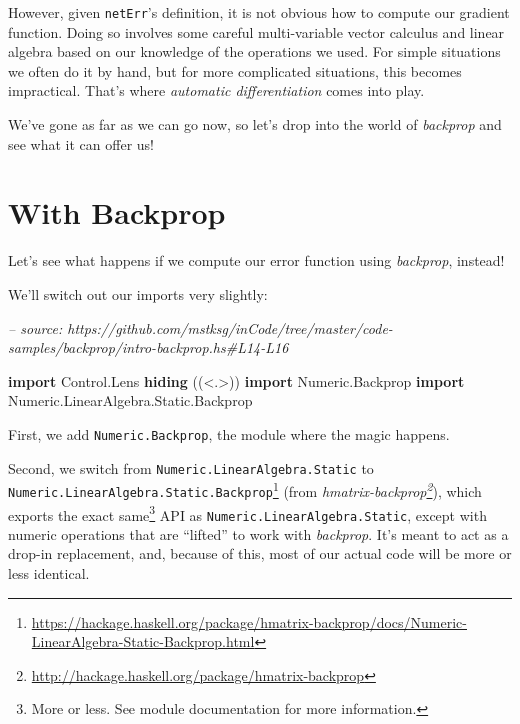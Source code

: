 \documentclass[]{article}
\newenvironment{Shaded}{}{}
\newcommand{\CommentTok}[1]{\textcolor[rgb]{0.38,0.63,0.69}{\textit{#1}}}
\newcommand{\DataTypeTok}[1]{\textcolor[rgb]{0.56,0.13,0.00}{#1}}
\newcommand{\KeywordTok}[1]{\textcolor[rgb]{0.00,0.44,0.13}{\textbf{#1}}}
\newcommand{\NormalTok}[1]{#1}
\renewcommand{\href}[2]{#2\footnote{\url{#1}}}
\begin{document}
However, given \texttt{netErr}'s definition, it is not obvious how to compute
our gradient function. Doing so involves some careful multi-variable vector
calculus and linear algebra based on our knowledge of the operations we used.
For simple situations we often do it by hand, but for more complicated
situations, this becomes impractical. That's where \emph{automatic
differentiation} comes into play.

We've gone as far as we can go now, so let's drop into the world of
\emph{backprop} and see what it can offer us!

\hypertarget{with-backprop}{%
\section{With Backprop}\label{with-backprop}}

Let's see what happens if we compute our error function using \emph{backprop},
instead!

We'll switch out our imports very slightly:

\begin{Shaded}
\begin{Highlighting}[]
\CommentTok{-- source: https://github.com/mstksg/inCode/tree/master/code-samples/backprop/intro-backprop.hs#L14-L16}

\KeywordTok{import}           \DataTypeTok{Control.Lens} \KeywordTok{hiding}\NormalTok{                   ((<.>))}
\KeywordTok{import}           \DataTypeTok{Numeric.Backprop}
\KeywordTok{import}           \DataTypeTok{Numeric.LinearAlgebra.Static.Backprop}
\end{Highlighting}
\end{Shaded}

First, we add \texttt{Numeric.Backprop}, the module where the magic happens.

Second, we switch from \texttt{Numeric.LinearAlgebra.Static} to
\href{https://hackage.haskell.org/package/hmatrix-backprop/docs/Numeric-LinearAlgebra-Static-Backprop.html}{\texttt{Numeric.LinearAlgebra.Static.Backprop}}
(from
\emph{\href{http://hackage.haskell.org/package/hmatrix-backprop}{hmatrix-backprop}}),
which exports the exact same\footnote{More or less. See module documentation for
  more information.} API as \texttt{Numeric.LinearAlgebra.Static}, except with
numeric operations that are ``lifted'' to work with \emph{backprop}. It's meant
to act as a drop-in replacement, and, because of this, most of our actual code
will be more or less identical.
\end{document}
